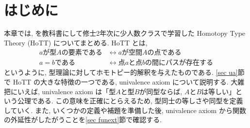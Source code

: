 \documentclass[11pt]{jsreport}
\theoremstyle{mystyle}
\newcommand{\0}{\textbf{0}}
\begin{document}
\section{はじめに}
本章では, \cite{hott}を教科書にして修士2年次に少人数クラスで学習した Homotopy Type Theory (HoTT) についてまとめる. HoTT とは, 
\begin{align*}
  \text{$a$が型$A$の要素である} &\leftrightarrow \text{$a$が空間$A$の点である} \\
  \text{$a = b$である} &\leftrightarrow \text{点$a$と点$b$の間にパスが存在する}
\end{align*}
というように, 型理論に対してホモトピー的解釈を与えたものである. \ref{sec ua}節で HoTT の大きな特徴の一つである, univalence axiom について説明する. 大雑把にいえば, univalence axiom は「型$A$と型$B$が同型ならば, $A$と$B$は等しい」という公理である. この意味を正確にとらえるため, 型同士の等しさや同型を定義していく. また, いくつかの定義や補題を準備した後, univalence axiom から関数の外延性がしたがうことを\ref{sec funext}節で確認する. 
\end{document}

